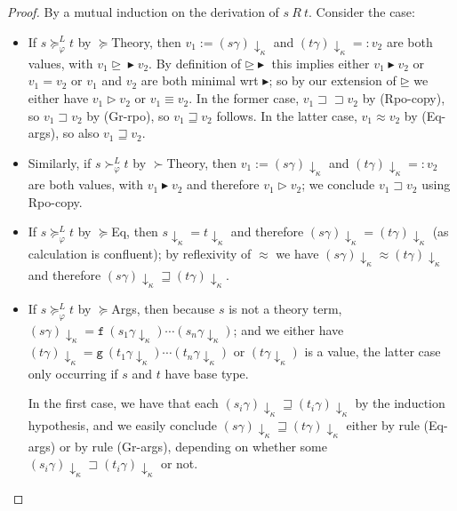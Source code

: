 \documentclass[a4paper,USenglish,cleveref,autoref,thm-restate]{lipics-v2021}
\newcommand{\gtvA}{L}
\newcommand{\downarrowcalc}{\downarrow_\kappa}
\newcommand{\grmain}{\sqsupset}
\newcommand{\geqmain}{\sqsupseteq}
\newcommand{\ismain}{\approx}
\newcommand{\rpomain}{\sqsupset\!\!\sqsupset}
\newcommand{\geqth}{\succeq_\varphi^\gtvA}
\newcommand{\grth}{\succ_\varphi^\gtvA}
\newcommand{\grpred}{\rhd}
\newcommand{\geqpred}{\unrhd}
\newcommand{\eqpred}{\equiv}
\newcommand{\grsort}{\blacktriangleright}
\newcommand{\geqsort}{\unrhd\!\!\!\!\!\!\blacktriangleright}
\newcommand{\symb}[1]{\mathtt{#1}}
\newcommand{\afun}{\symb{f}}
\newcommand{\bfun}{\symb{g}}
\begin{document}
\begin{proof}
By a mutual induction on the derivation of $s\ R\ t$.  Consider the case:
\begin{itemize}
\item If $s \geqth t$ by $\succeq$Theory, then $v_1 := (s\gamma)\downarrowcalc$ and
  $(t\gamma)\downarrowcalc =: v_2$ are both values, with $v_1 \geqsort v_2$.
  By definition of $\geqsort$ this implies either $v_1 \grsort v_2$ or $v_1 = v_2$ or $v_1$ and
  $v_2$ are both minimal wrt $\grsort$; so by our extension of $\geqpred$ we either have
  $v_1 \grpred v_2$ or $v_1 \eqpred v_2$.  In the former case,
  $v_1 \rpomain v_2$ by (Rpo-copy), so $v_1 \grmain v_2$ by (Gr-rpo), so $v_1 \geqmain v_2$ follows.
  In the latter case, $v_1 \ismain v_2$ by (Eq-args), so also $v_1 \geqmain v_2$.
\item Similarly, if $s \grth t$ by $\succ$Theory, then $v_1 := (s\gamma)\downarrowcalc$ and
  $(t\gamma)\downarrowcalc =: v_2$ are both values, with $v_1 \grsort v_2$ and therefore
  $v_1 \grpred v_2$; we conclude $v_1 \grmain v_2$ using Rpo-copy.
\item If $s \geqth t$ by $\succeq$Eq, then $s\downarrowcalc = t\downarrowcalc$ and therefore
  $(s\gamma)\downarrowcalc = (t\gamma)\downarrowcalc$ (as calculation is confluent); by
  reflexivity of $\ismain$ we have $(s\gamma)\downarrowcalc \ismain (t\gamma)\downarrowcalc$ and
  therefore $(s\gamma)\downarrowcalc \geqmain (t\gamma)\downarrowcalc$.
\item If $s \geqth t$ by $\succeq$Args, then because $s$ is not a theory term,
  $(s\gamma)\downarrowcalc = \afun\ (s_1\gamma\downarrowcalc) \cdots (s_n\gamma\downarrowcalc)$;
  and we either have $(t\gamma)\downarrowcalc = \bfun\ (t_1\gamma\downarrowcalc) \cdots
  (t_n\gamma\downarrowcalc)$ or $(t\gamma\downarrowcalc)$ is a value, the latter case only occurring
  if $s$ and $t$ have base type.

  In the first case, we have that each $(s_i\gamma)\downarrowcalc \geqmain
  (t_i\gamma)\downarrowcalc$ by the induction hypothesis, and we easily conclude
  $(s\gamma)\downarrowcalc \geqmain (t\gamma)\downarrowcalc$ either by rule (Eq-args) or by rule
  (Gr-args), depending on whether some $(s_i\gamma)\downarrowcalc \grmain (t_i\gamma)\downarrowcalc$
  or not.


\end{itemize}
\end{proof}
\end{document}
